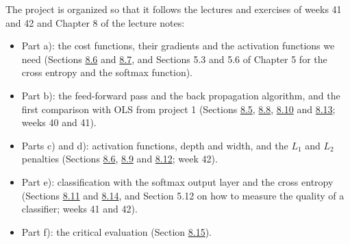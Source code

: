\documentclass[11pt,a4paper]{article}
\begin{document}
The project is organized so that it follows the lectures and exercises of
weeks 41 and 42 and Chapter 8 of the lecture notes:
\begin{itemize}[nosep]
  \item Part a): the cost functions, their gradients and the activation
        functions we need (Sections
        \href{https://educationalmaterialuio.github.io/MachineLearningUiO/doc/LectureNotes/_build/html/chapter8.html#activation-functions}{8.6}
        and
        \href{https://educationalmaterialuio.github.io/MachineLearningUiO/doc/LectureNotes/_build/html/chapter8.html#the-cost-function-and-the-optimisation-problem}{8.7},
        and Sections 5.3 and 5.6 of Chapter 5 for the cross entropy and the
        softmax function).
  \item Part b): the feed-forward pass and the back propagation algorithm,
        and the first comparison with OLS from project 1 (Sections
        \href{https://educationalmaterialuio.github.io/MachineLearningUiO/doc/LectureNotes/_build/html/chapter8.html#notation-and-the-feed-forward-pass}{8.5},
        \href{https://educationalmaterialuio.github.io/MachineLearningUiO/doc/LectureNotes/_build/html/chapter8.html#backpropagation}{8.8},
        \href{https://educationalmaterialuio.github.io/MachineLearningUiO/doc/LectureNotes/_build/html/chapter8.html#weight-initialisation}{8.10}
        and
        \href{https://educationalmaterialuio.github.io/MachineLearningUiO/doc/LectureNotes/_build/html/chapter8.html#a-neural-network-from-scratch}{8.13};
        weeks 40 and 41).
  \item Parts c) and d): activation functions, depth and width, and the
        $L_1$ and $L_2$ penalties (Sections
        \href{https://educationalmaterialuio.github.io/MachineLearningUiO/doc/LectureNotes/_build/html/chapter8.html#activation-functions}{8.6},
        \href{https://educationalmaterialuio.github.io/MachineLearningUiO/doc/LectureNotes/_build/html/chapter8.html#vanishing-and-exploding-gradients}{8.9}
        and
        \href{https://educationalmaterialuio.github.io/MachineLearningUiO/doc/LectureNotes/_build/html/chapter8.html#regularisation-and-hyperparameters}{8.12};
        week 42).
  \item Part e): classification with the softmax output layer and the
        cross entropy (Sections
        \href{https://educationalmaterialuio.github.io/MachineLearningUiO/doc/LectureNotes/_build/html/chapter8.html#classification-with-neural-networks}{8.11}
        and
        \href{https://educationalmaterialuio.github.io/MachineLearningUiO/doc/LectureNotes/_build/html/chapter8.html#examples}{8.14},
        and Section 5.12 on how to measure the quality of a classifier;
        weeks 41 and 42).
  \item Part f): the critical evaluation (Section
        \href{https://educationalmaterialuio.github.io/MachineLearningUiO/doc/LectureNotes/_build/html/chapter8.html#limitations-and-a-top-down-view}{8.15}).
\end{itemize}
\end{document}
